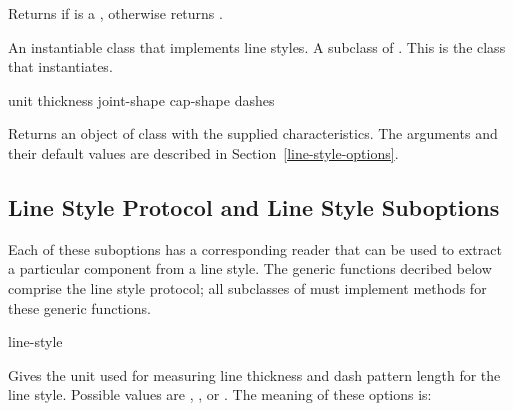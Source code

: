 Returns  if  is a , otherwise returns
.


An instantiable class that implements line styles.  A subclass of
.  This is the class that  instantiates.
\Immutable

 {\key unit thickness joint-shape cap-shape dashes}

Returns an object of class  with the supplied
characteristics.  The arguments and their default values are described in
Section~\ref{line-style-options}.


\subsection {Line Style Protocol and Line Style Suboptions\label{line-style-options}}

Each of these suboptions has a corresponding reader that can be used to extract
a particular component from a line style.  The generic functions decribed below
comprise the line style protocol; all subclasses of  must
implement methods for these generic functions.

 {line-style}

Gives the unit used for measuring line thickness and dash pattern length for the
line style.  Possible values are , , or .
The meaning of these options is:

